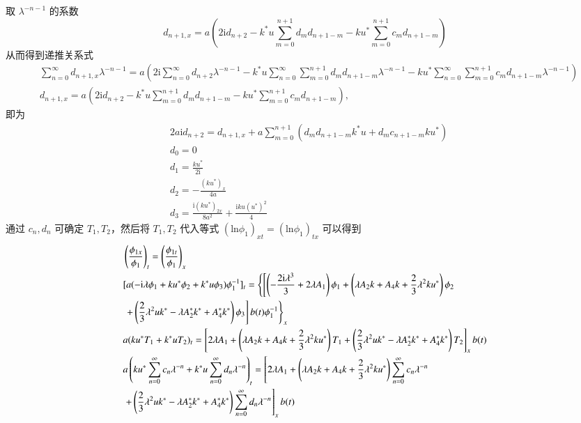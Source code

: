 取 $\lambda^{-n-1}$ 的系数
\begin{equation}
  d_{n+1,x} = a\left(2\mathrm{i}d_{n+2} - k^{*}u\sum_{m=0}^{n+1}d_{m}d_{n+1-m} - ku^{*}\sum_{m=0}^{n+1}c_{m}d_{n+1-m}\right)
\end{equation}
从而得到递推关系式
\begin{align}
	&\sum_{n=0}^{\infty}d_{n+1,x}\lambda^{-n-1}=a\left(2\mathrm{i} \sum_{n=0}^{\infty}d_{n+2}\lambda^{-n-1}-k^*u\sum_{n=0}^{\infty}\sum_{m=0}^{n+1}d_md_{n+1-m}\lambda^{-n-1}-ku^*\sum_{n=0}^{\infty}\sum_{m=0}^{n+1}c_md_{n+1-m}\lambda^{-n-1}\right)\nonumber\\
	&d_{n+1,x}=a\left(2\mathrm{i}d_{n+2}-k^*u\sum_{m=0}^{n+1}d_md_{n+1-m}-ku^*\sum_{m=0}^{n+1}c_md_{n+1-m}\right),\nonumber
\end{align}
即为
\begin{align}
  & 2a\mathrm{i}d_{n+2} = d_{n+1,x} + a\sum_{m=0}^{n+1}(d_{m}d_{n+1-m}k^{*}u + d_{m}c_{n+1-m}ku^{*}) \\
  & d_{0} = 0 \\
  & d_{1} = \frac{ku^{*}}{2\mathrm{i}} \\
  & d_{2} = -\frac{(ku^{*})_{x}}{4a} \\
  & d_{3} = \frac{\mathrm{i}(ku^{*})_{2x}}{8a^{2}} + \frac{\mathrm{i}ku(u^{*})^{2}}{4}
\end{align}
通过 $c_{n}, d_{n}$ 可确定 $T_{1}, T_{2}$，然后将 $T_{1}, T_{2}$ 代入等式 $(\mathrm{ln} \phi_{1})_{xt} = (\mathrm{ln} \phi_{1})_{tx}$ 可以得到
\begin{align}
  & \left(\frac{\phi_{1x}}{\phi_{1}}\right)_{t} = \left(\frac{\phi_{1t}}{\phi_{1}}\right)_{x} \\
  & [a(-\mathrm{i}\lambda\phi_{1} + ku^{*}\phi_{2} +k^{*}u\phi_{3})\phi_{1}^{-1}]_{t} = \left\{\left[\left(-\frac{2\mathrm{i}\lambda^{3}}{3}+2\lambda A_{1}\right)\phi_{1} + \left(\lambda A_{2}k+A_{4}k+\frac{2}{3}\lambda^{2}ku^{*}\right)\phi_{2} \right.\right. \notag\\
  & \left.\left. + \left(\frac{2}{3}\lambda^{2}uk^{*}-\lambda A_{2}^{*}k^{*}+A_{4}^{*}k^{*}\right)\phi_{3}\right]b(t)\phi_{1}^{-1}\right\}_{x} \\
  & a(ku^{*}T_{1} + k^{*}uT_{2})_{t} = \left[2\lambda A_{1} + \left(\lambda A_{2}k+A_{4}k+\frac{2}{3}\lambda^{2}ku^{*}\right)T_{1} + \left(\frac{2}{3}\lambda^{2}uk^{*}-\lambda A_{2}^{*}k^{*}+A_{4}^{*}k^{*}\right)T_{2}\right]_{x}b(t) \\
  & a\left(ku^{*}\sum_{n=0}^{\infty}c_{n}\lambda^{-n} + k^{*}u\sum_{n=0}^{\infty}d_{n}\lambda^{-n}\right)_{t} = \left[2\lambda A_{1} + \left(\lambda A_{2}k+A_{4}k+\frac{2}{3}\lambda^{2}ku^{*}\right)\sum_{n=0}^{\infty}c_{n}\lambda^{-n} \right. \notag\\
  & \left. + \left(\frac{2}{3}\lambda^{2}uk^{*}-\lambda A_{2}^{*}k^{*}+A_{4}^{*}k^{*}\right)\sum_{n=0}^{\infty}d_{n}\lambda^{-n}\right]_{x}b(t)
\end{align}
